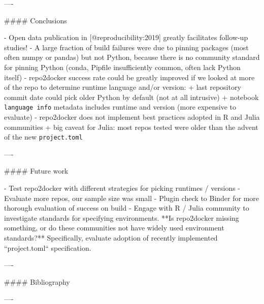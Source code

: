 \documentclass{beamer}
\begin{document}
\begin{frame}[fragile]
\begin{columns}[T]
\begin{column}{.3\textwidth}
\begin{markdown}
----


#### Conclusions

- Open data publication in [@reproducibility:2019] greatly facilitates follow-up studies!
- A large fraction of build failures were due to pinning packages (most often numpy or pandas)
  but not Python, because there is no community standard for pinning Python (conda, Pipfile insufficiently common, often lack Python itself)
- repo2docker success rate could be greatly improved if we looked at more of the repo to determine runtime language and/or version:
    + last repository commit date could pick older Python by default (not at all intrusive)
    + notebook \texttt{language info} metadata includes runtime and version (more expensive to evaluate)
- repo2docker does not implement best practices adopted in R and Julia communities
    + big caveat for Julia: most repos tested were older than the advent of the new \texttt{project.toml}

----

#### Future work

- Test repo2docker with different strategies for picking runtimes / versions
- Evaluate more repos, our sample size was small
- Plugin check to Binder for more thorough evaluation of success on build
- Engage with R / Julia community to investigate standards for specifying environments.
  **Is repo2docker missing something, or do these communities not have widely used environment standards?** Specifically, evaluate adoption of recently implemented ``project.toml`` specification.

----

#### Bibliography




----

\end{markdown}
\end{column}
\end{columns}

\end{frame}
\end{document}
